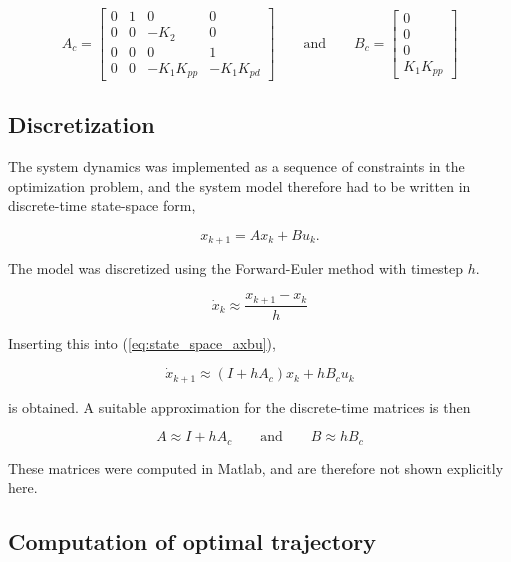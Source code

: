 \begin{equation}
	A_c = \begin{bmatrix} 0 & 1 & 0 & 0 \\ 0 & 0 & -K_2 & 0 \\ 0 & 0 & 0 & 1 \\ 0 & 0 & -K_1K_{pp} & -K_1K_{pd} \end{bmatrix}
	\qquad\text{and}\qquad
	B_c = \begin{bmatrix}0 \\ 0 \\ 0 \\K_1K_{pp} \end{bmatrix}
\end{equation}


\subsection{Discretization}

The system dynamics was implemented as a sequence of constraints in the optimization problem, and the system model therefore had to be written in discrete-time state-space form,

\begin{equation}
	x_{k+1} = Ax_k + Bu_k.
	\label{eq:discrete_state_space_axbu}
\end{equation}

The model was discretized using the Forward-Euler method with timestep $h$.

\begin{equation}
	\dot{x}_k \approx \frac{x_{k+1} - x_k}{h}
\end{equation}

Inserting this into (\ref{eq:state_space_axbu}),

\begin{equation}
	\dot{x}_{k+1} \approx (I + hA_c) x_k + hB_c u_k
\end{equation}

is obtained. A suitable approximation for the discrete-time matrices is then

\begin{equation}
	A \approx I + hA_c
	\qquad\text{and}\qquad
	B \approx hB_c
\end{equation}

These matrices were computed in Matlab, and are therefore not shown explicitly here.


\subsection{Computation of optimal trajectory}

